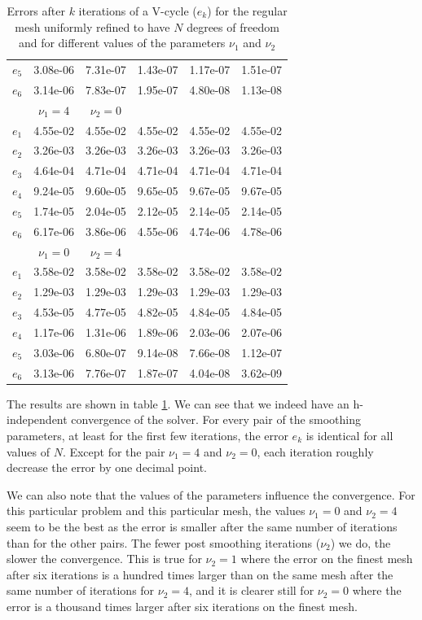 \begin{table}
\begin{tabular}{c|ccccc}
  $e_5$ & 3.08e-06 &	7.31e-07 &	1.43e-07 &	1.17e-07 &	1.51e-07\\
  $e_6$ & 3.14e-06 &	7.83e-07 &	1.95e-07 &	4.80e-08 &	1.13e-08\\
  \hline
   & $\nu_1=4$ & $\nu_2=0$ & & &\\
  \hline
  $e_1$ & 4.55e-02 &	4.55e-02 &	4.55e-02 &	4.55e-02 &	4.55e-02\\
  $e_2$ & 3.26e-03 &	3.26e-03 &	3.26e-03 &	3.26e-03 &	3.26e-03\\
  $e_3$ & 4.64e-04 &	4.71e-04 &	4.71e-04 &	4.71e-04 &	4.71e-04\\
  $e_4$ & 9.24e-05 &	9.60e-05 &	9.65e-05 &	9.67e-05 &	9.67e-05\\
  $e_5$ & 1.74e-05 &	2.04e-05 &	2.12e-05 &	2.14e-05 &	2.14e-05\\
  $e_6$ & 6.17e-06 &	3.86e-06	& 4.55e-06	& 4.74e-06 &	4.78e-06\\
  \hline
  & $\nu_1=0$ & $\nu_2=4$ & & &\\
  \hline
  $e_1$ & 3.58e-02 &	3.58e-02 &	3.58e-02 &	3.58e-02 &	3.58e-02\\
  $e_2$ & 1.29e-03 &	1.29e-03 &	1.29e-03 &	1.29e-03 &	1.29e-03\\
  $e_3$ & 4.53e-05 &	4.77e-05 &	4.82e-05 &	4.84e-05 &	4.84e-05\\
  $e_4$ & 1.17e-06 &	1.31e-06 &	1.89e-06 &	2.03e-06 &	2.07e-06\\
  $e_5$ & 3.03e-06 &	6.80e-07 &	9.14e-08 &	7.66e-08 &	1.12e-07\\
  $e_6$ & 3.13e-06 &	7.76e-07 &	1.87e-07 &	4.04e-08 &	3.62e-09\\
  \hline
\end{tabular}
\caption{Errors after $k$ iterations of a V-cycle ($e_k$) for the regular mesh uniformly refined to have $N$ degrees of freedom and for different values of the parameters $\nu_1$ and $\nu_2$}
\label{multi_err_nu}
\end{table}

The results are shown in table \ref{multi_err_nu}. We can see that we indeed have an h-independent convergence of the solver. For every pair of the smoothing parameters, at least for the first few iterations, the error $e_k$ is identical for all values of $N$. Except for the pair $\nu_1 = 4$ and $\nu_2 = 0$, each iteration roughly decrease the error by one decimal point.

We can also note that the values of the parameters influence the convergence. For this particular problem and this particular mesh, the values $\nu_1 = 0$ and  $\nu_2 = 4$ seem to be the best as the error is smaller after the same number of iterations than for the other pairs. The fewer post smoothing iterations ($\nu_2$) we do, the slower the convergence. This is true for $\nu_2 = 1$ where the error on the finest mesh after six iterations is a hundred times larger than on the same mesh after the same number of iterations for $\nu_2=4$, and it is clearer still for $\nu_2=0$ where the error is a thousand times larger after six iterations on the finest mesh.

